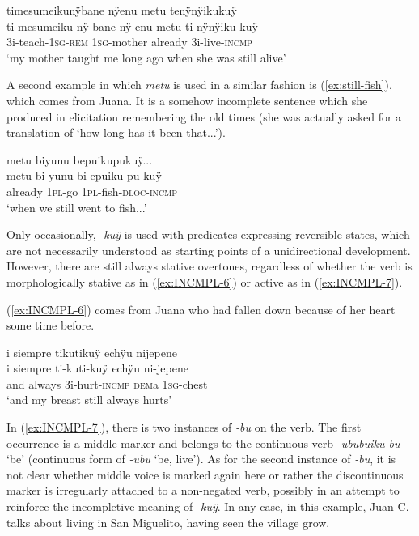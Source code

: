 \newpage

\ea\label{ex:still-alive}
\begingl
\glpreamble timesumeikunÿbane nÿenu metu tenÿnÿikukuÿ\\
\gla ti-mesumeiku-nÿ-bane nÿ-enu metu ti-nÿnÿiku-kuÿ\\
\glb 3i-teach-1\textsc{sg}-\textsc{rem} 1\textsc{sg}-mother already 3i-live-\textsc{incmp}\\
\glft ‘my mother taught me long ago when she was still alive’
\endgl
\trailingcitation{[rxx-e181022le]}
\xe

A second example in which \textit{metu} is used in a similar fashion is (\ref{ex:still-fish}), which comes from Juana. It is a somehow incomplete sentence which she produced in elicitation remembering the old times (she was actually asked for a translation of ‘how long has it been that...’).

\ea\label{ex:still-fish}
\begingl
\glpreamble metu biyunu bepuikupukuÿ...\\
\gla metu bi-yunu bi-epuiku-pu-kuÿ\\
\glb already 1\textsc{pl}-go 1\textsc{pl}-fish-\textsc{dloc}-\textsc{incmp}\\
\glft ‘when we still went to fish...’
\endgl
\trailingcitation{[jxx-e190210s-01]}
\xe


Only occasionally, \textit{-kuÿ} is used with predicates expressing reversible states, which are not necessarily understood as starting points of a unidirectional development. However, there are still always stative overtones, regardless of whether the verb is morphologically stative as in (\ref{ex:INCMPL-6}) or active as in (\ref{ex:INCMPL-7}).

(\ref{ex:INCMPL-6}) comes from Juana who had fallen down because of her heart some time before.

\ea\label{ex:INCMPL-6}
\begingl
\glpreamble i siempre tikutikuÿ echÿu nijepene\\
\gla i siempre ti-kuti-kuÿ echÿu ni-jepene\\
\glb and always 3i-hurt-\textsc{incmp} \textsc{dem}a 1\textsc{sg}-chest\\
\glft ‘and my breast still always hurts’
\endgl
\trailingcitation{[jxx-p120430l-1.322]}
\xe

In (\ref{ex:INCMPL-7}), there is two instances of \textit{-bu} on the verb. The first occurrence is a middle marker and belongs to the continuous verb \textit{-ububuiku-bu} ‘be’ (continuous form of \textit{-ubu} ‘be, live’). As for the second instance of \textit{-bu}, it is not clear whether middle voice is marked again here or rather the discontinuous marker is irregularly attached to a non-negated verb, possibly in an attempt to reinforce the incompletive meaning of \textit{-kuÿ}. In any case, in this example, Juan C. talks about living in San Miguelito, having seen the village grow.

